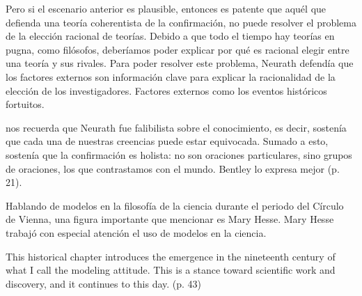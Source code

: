 Pero si el escenario anterior es plausible, entonces es patente que aquél que defienda una teoría coherentista de la confirmación, no puede resolver el problema de la elección racional de teorías.
Debido a que todo el tiempo hay teorías en pugna, como filósofos, deberíamos poder explicar por qué es racional elegir entre una teoría y sus rivales. Para poder resolver este problema, Neurath defendía que los factores externos son información clave para explicar la racionalidad de la elección de los investigadores.
Factores externos como los eventos históricos fortuitos.

\textcite{Bentley2023} nos recuerda que Neurath fue falibilista sobre el conocimiento, es decir,  sostenía que cada una de nuestras creencias puede estar equivocada.
Sumado a esto, sostenía que la confirmación es holista: no son oraciones particulares, sino grupos de oraciones, los que contrastamos con el mundo.
Bentley lo expresa mejor  (p. 21).

\begin{kaobox}[title=To do]
Hablando de modelos en la filosofía de la ciencia durante el periodo del Círculo de Vienna, una figura importante que mencionar es Mary Hesse.
Mary Hesse trabajó con especial atención el uso de modelos en la ciencia.
\end{kaobox}

\begin{kaobox}[title=To do]
This historical chapter introduces the emergence in the nineteenth century of  what I call the modeling attitude. This is a stance toward scientific work and  discovery, and it continues to this day. (p. 43)
\end{kaobox}




